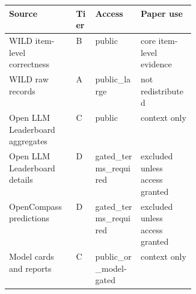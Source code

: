 \begin{tabular}{p{0.36\linewidth}lll}
\toprule
Source & Tier & Access & Paper use \\
\midrule
WILD item-level correctness & B & public & core item-level evidence \\
WILD raw records & A & public\_large & not redistributed \\
Open LLM Leaderboard aggregates & C & public & context only \\
Open LLM Leaderboard details & D & gated\_terms\_required & excluded unless access granted \\
OpenCompass predictions & D & gated\_terms\_required & excluded unless access granted \\
Model cards and reports & C & public\_or\_model-gated & context only \\
\bottomrule
\end{tabular}
